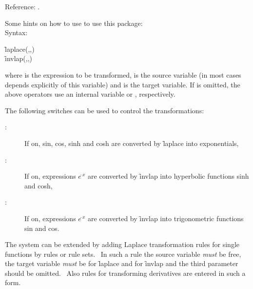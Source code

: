 


\hypertarget{operator:LAPLACE}{}
\hypertarget{operator:INVLAP}{}
Reference: \cite{Kazasov:87}.

Some hints on how to use to use this package: \\[\baselineskip]
%
Syntax:
\begin{syntax}
  \f{laplace}(,,) \\[\baselineskip]
%
  \f{invlap}(,,)
\end{syntax}
%
where  is the expression to be transformed,  is the source
variable (in most cases  depends explicitly of this variable) and
 is the target variable. If  is omitted, the above operators use
an internal variable  or , respectively.

The following switches can be used to control the transformations: \\
\hypertarget{switch:LMON}{}
\hypertarget{switch:LHYP}{}
\hypertarget{switch:LTRIG}{}
\begin{description}
\item[:] If on, sin, cos, sinh and cosh are converted by \f{laplace} into
exponentials,
\item[:] If on, expressions $e^{\tilde\ x}$ are converted by \f{invlap} into 
hyperbolic functions sinh and cosh,
\item[:] If on, expressions $e^{\tilde\ x}$ are converted by \f{invlap} into
trigonometric functions sin and cos.
\end{description}

The system can be extended by adding Laplace transformation rules for
single functions by rules or rule sets.~ In such a rule the source
variable \emph{must} be free, the target variable \emph{must} be  for \f{laplace} and
 for \f{invlap} and the third parameter should be omitted.~ Also rules for
transforming derivatives are entered in such a form.

